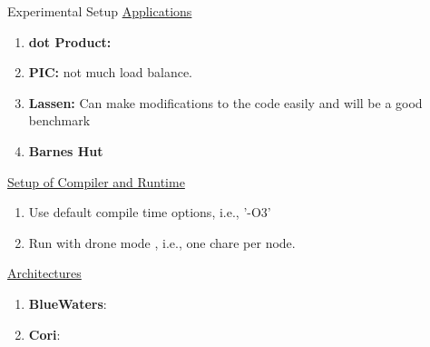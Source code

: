 
\begin{frame}{Experimental Setup}
   \underline{Applications}\\ 
   \begin{enumerate} 
   \item {\bf dot Product:}
   \item  {\bf PIC:} not much load balance.
  \item {\bf Lassen:} Can make modifications to the code easily and will be a good benchmark 
  \item {\bf Barnes Hut}
  \end{enumerate} 
  \underline{Setup of Compiler and Runtime}\\
  \begin{enumerate}
      \item Use default compile time options, i.e., '-O3'
      \item Run with drone mode , i.e., one chare per node. 
  \end{enumerate} 
  \underline{Architectures} \\
  \begin{enumerate}
  \item \textbf{BlueWaters}:
  \item \textbf{Cori}:
  \end{enumerate} 
\end{frame}


